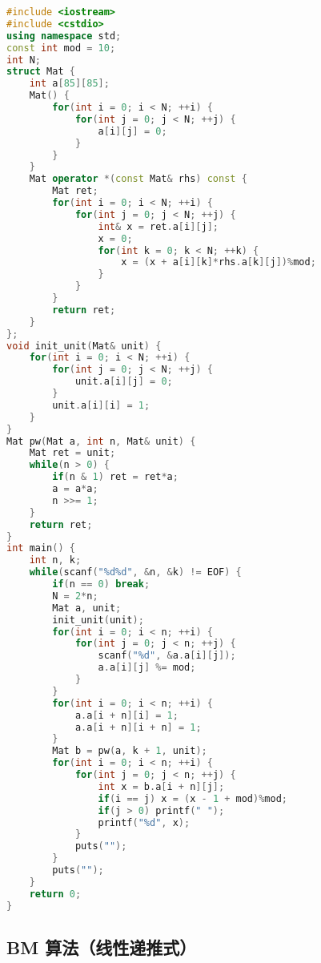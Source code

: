 \begin{lstlisting}[language=C++]
#include <iostream>
#include <cstdio>
using namespace std;
const int mod = 10;
int N;
struct Mat {
    int a[85][85];
    Mat() {
        for(int i = 0; i < N; ++i) {
            for(int j = 0; j < N; ++j) {
                a[i][j] = 0;
            }
        }
    }
    Mat operator *(const Mat& rhs) const {
        Mat ret;
        for(int i = 0; i < N; ++i) {
            for(int j = 0; j < N; ++j) {
                int& x = ret.a[i][j];
                x = 0;
                for(int k = 0; k < N; ++k) {
                    x = (x + a[i][k]*rhs.a[k][j])%mod;
                }
            }
        }
        return ret;
    }
};
void init_unit(Mat& unit) {
    for(int i = 0; i < N; ++i) {
        for(int j = 0; j < N; ++j) {
            unit.a[i][j] = 0;
        }
        unit.a[i][i] = 1;
    }
}
Mat pw(Mat a, int n, Mat& unit) {
    Mat ret = unit;
    while(n > 0) {
        if(n & 1) ret = ret*a;
        a = a*a;
        n >>= 1;
    }
    return ret;
}
int main() {
    int n, k;
    while(scanf("%d%d", &n, &k) != EOF) {
        if(n == 0) break;
        N = 2*n;
        Mat a, unit;
        init_unit(unit);
        for(int i = 0; i < n; ++i) {
            for(int j = 0; j < n; ++j) {
                scanf("%d", &a.a[i][j]);
                a.a[i][j] %= mod;
            }
        }
        for(int i = 0; i < n; ++i) {
            a.a[i + n][i] = 1;
            a.a[i + n][i + n] = 1;
        }
        Mat b = pw(a, k + 1, unit);
        for(int i = 0; i < n; ++i) {
            for(int j = 0; j < n; ++j) {
                int x = b.a[i + n][j];
                if(i == j) x = (x - 1 + mod)%mod;
                if(j > 0) printf(" ");
                printf("%d", x);
            }
            puts("");
        }
        puts("");
    }
    return 0;
}
\end{lstlisting}

\subsection{BM 算法（线性递推式）}

